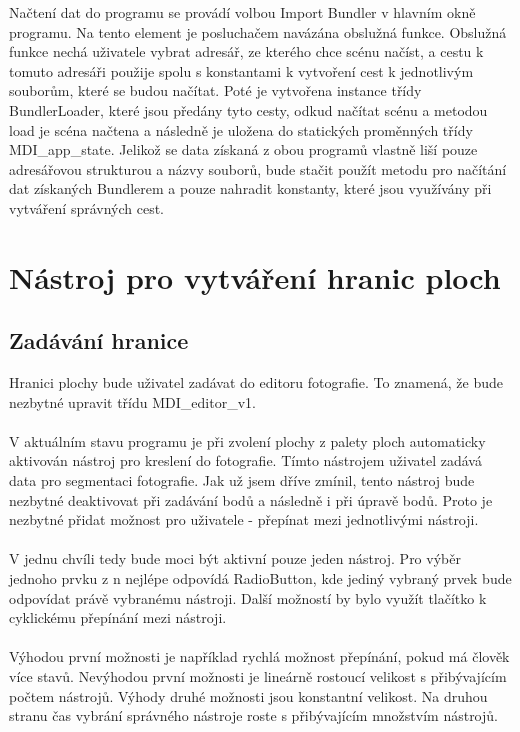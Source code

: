 \documentclass[11pt,twoside,a4paper]{book}
\begin{document}
Načtení dat do programu se provádí volbou Import Bundler v hlavním okně programu. Na tento element je posluchačem navázána obslužná funkce. Obslužná funkce nechá uživatele vybrat adresář, ze kterého chce scénu načíst, a cestu k tomuto adresáři použije spolu s konstantami k vytvoření cest k jednotlivým souborům, které se budou načítat. Poté je vytvořena instance třídy BundlerLoader, které jsou předány tyto cesty, odkud načítat scénu a metodou load je scéna načtena a následně je uložena do statických proměnných třídy MDI\_app\_state.  
Jelikož se data získaná z obou programů vlastně liší pouze adresářovou strukturou a názvy souborů, bude stačit použít metodu pro načítání dat získaných Bundlerem a pouze nahradit konstanty, které jsou využívány při vytváření správných cest.

\section{Nástroj pro vytváření hranic ploch}

\subsection{Zadávání hranice}
\label{cycle}
Hranici plochy bude uživatel zadávat do editoru fotografie. To znamená, že bude nezbytné upravit třídu MDI\_editor\_v1.
\paragraph{} 
V aktuálním stavu programu je při zvolení plochy z palety ploch automaticky aktivován nástroj pro kreslení do fotografie. Tímto nástrojem uživatel zadává data pro segmentaci fotografie. Jak už jsem dříve zmínil, tento nástroj bude nezbytné deaktivovat při zadávání bodů a následně i při úpravě bodů. Proto je nezbytné přidat možnost pro uživatele - přepínat mezi jednotlivými nástroji. 
\paragraph{}
V jednu chvíli tedy bude moci být aktivní pouze jeden nástroj. Pro výběr jednoho prvku z n nejlépe odpovídá RadioButton, kde jediný vybraný prvek bude odpovídat právě vybranému nástroji. Další možností by bylo využít tlačítko k cyklickému přepínání mezi nástroji.
\paragraph{}
Výhodou první možnosti je například rychlá možnost přepínání, pokud má člověk více stavů. Nevýhodou první možnosti je lineárně rostoucí velikost s přibývajícím počtem nástrojů. Výhody druhé možnosti jsou konstantní velikost. Na druhou stranu čas vybrání správného nástroje roste s přibývajícím množstvím nástrojů.
\end{document}
